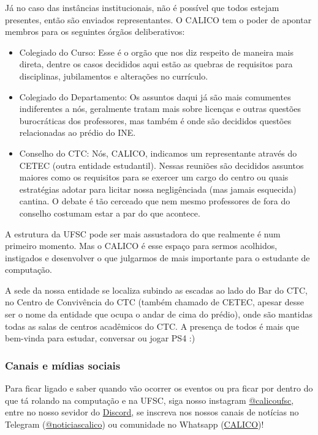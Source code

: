 Já no caso das instâncias institucionais, não é possível que todos estejam presentes, então são enviados representantes. O CALICO tem o poder de apontar membros para os seguintes órgãos deliberativos:
\begin{itemize}
    \item Colegiado do Curso: Esse é o orgão que nos diz respeito de maneira mais direta, dentre os casos decididos aqui estão as quebras de requisitos para disciplinas, jubilamentos e alterações no currículo.
    \item Colegiado do Departamento: Os assuntos daqui já são mais comumentes indiferentes a nós, geralmente tratam mais sobre licenças e outras questões burocráticas dos professores, mas também é onde são decididos questões relacionadas ao prédio do INE. 
    \item Conselho do CTC: Nós, CALICO, indicamos um representante através do CETEC (outra entidade estudantil). Nessas reuniões são decididos assuntos maiores como os requisitos para se exercer um cargo do centro ou quais estratégias adotar para licitar nossa negligênciada (mas jamais esquecida) cantina. O debate é tão cerceado que nem mesmo professores de fora do conselho costumam estar a par do que acontece.
\end{itemize}


A estrutura da UFSC pode ser mais assustadora do que realmente é num primeiro momento. Mas o CALICO é esse espaço para sermos acolhidos, instigados e desenvolver o que julgarmos de mais importante para o estudante de computação.

A sede da nossa entidade se localiza subindo as escadas ao lado do Bar do CTC, no Centro de Convivência do CTC (também chamado de CETEC, apesar desse ser o nome da entidade que ocupa o andar de cima do prédio), onde são mantidas todas as salas de centros acadêmicos do CTC. A presença de todos é mais que bem-vinda para estudar, conversar ou jogar PS4 :)

\subsubsection{Canais e mídias sociais}
Para ficar ligado e saber quando vão ocorrer os eventos ou pra ficar por dentro do que tá rolando na computação e na UFSC, siga nosso instagram \href{https://www.instagram.com/calicoufsc/}{@calicoufsc}, entre no nosso sevidor do \href{https://discord.gg/YPU4MHmp}{Discord}, se inscreva nos nossos canais de notícias no Telegram (\href{https://t.me/noticiascalico}{@noticiascalico}) ou comunidade no Whatsapp (\href{https://chat.whatsapp.com/KPH3O3ZBJEd9Nwijvbwt9d}{CALICO})!
